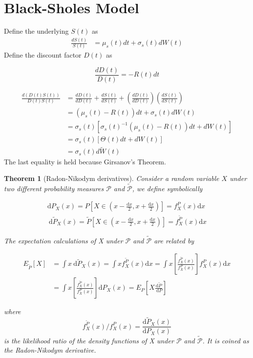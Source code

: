 \documentclass[a4]{article}
\newtheorem{theorem}{Theorem}
\begin{document}
\section{Black-Sholes Model}
Define the underlying $S(t)$ as
$$
\begin{aligned}
\frac{dS(t)}{S(t)} &= \mu_{s}(t)dt + \sigma_{s}(t)dW(t)
\end{aligned}
$$
Define the discount factor $D(t)$ as\par 
$$
\frac{dD(t)}{D(t)} = -R(t)dt
$$\par 
$$
\begin{aligned}
\frac{d(D(t)S(t))}{D(t)S(t)} &= \frac{dD(t)}{dD(t)} +  \frac{dS(t)}{dS(t)} + ( \frac{dD(t)}{dD(t)})( \frac{dS(t)}{dS(t)})\\
& = (\mu_{s}(t)-R(t))dt + \sigma_{s}(t)dW(t)\\
&= \sigma_{s}(t)[\sigma_{s}(t)^{-1}(\mu_{s}(t) - R(t))dt + dW(t)]\\
&= \sigma_{s}(t)[\Theta (t)dt + dW(t)]\\
&=\sigma_{s}(t)d\tilde{W}(t)
\end{aligned}
$$
The last equality is held because Girsanov's Theorem. 
\begin{theorem}[Radon-Nikodym derivatives]
	Consider a random variable $X$ under two different probability measures $\mathcal{P}$ and  $\tilde{\mathcal{P}}$, we define symbolically\par 
	$$
	\begin{array}{l}
	\mathrm{d} P_{X}(x)=P\left[X \in\left(x-\frac{\mathrm{d} x}{2}, x+\frac{\mathrm{d} x}{2}\right)\right]=f_{X}^{P}(x) \mathrm{d} x \\
	\mathrm{~d} \widetilde{P}_{X}(x)=\widetilde{P}\left[X \in\left(x-\frac{\mathrm{d} x}{2}, x+\frac{\mathrm{d} x}{2}\right)\right]=f_{X}^{\widetilde{P}}(x) \mathrm{d} x
	\end{array}
	$$\par 
	\bigbreak
	
	\noindent The expectation calculations of X under  $\mathcal{P}$ and 	$\tilde{\mathcal{P}}$ are related by \par 
	$$
	\begin{aligned}
	E_{\widetilde{P}}[X] &=\int x \mathrm{~d} \widetilde{P}_{X}(x)=\int x f_{X}^{\widetilde{P}}(x) \mathrm{d} x=\int x\left[\frac{f_{X}^{\widetilde{P}}(x)}{f_{X}^{P}(x)}\right] f_{X}^{P}(x) \mathrm{d} x \\
	&=\int x\left[\frac{f_{X}^{\widetilde{P}}(x)}{f_{X}^{P}(x)}\right] \mathrm{d} P_{X}(x)=E_{P}\left[X \frac{\mathrm{d} \tilde{P}}{\mathrm{~d} P}\right]
	\end{aligned}
	$$\par 
	where $$
	f_{X}^{\widetilde{P}}(x) / f_{X}^{P}(x)=\frac{\mathrm{d} \widetilde{P}_{X}(x)}{\mathrm{d} P_{X}(x)}
	$$ is the likelihood ratio of the density functions of X under $\mathcal{P}$ and $\tilde{\mathcal{P}}$. It is coined as the Radon-Nikodym derivative.
\end{theorem}
\end{document}

